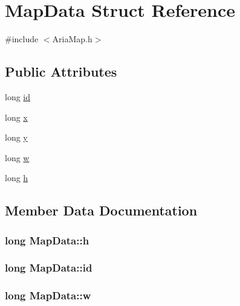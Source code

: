 \hypertarget{structMapData}{}\section{Map\+Data Struct Reference}
\label{structMapData}


{\ttfamily \#include $<$Aria\+Map.\+h$>$}

\subsection*{Public Attributes}
\begin{DoxyCompactItemize}
\item 
long \hyperlink{structMapData_ad27eaf83bb30b0b46e224d5cd78b34b7}{id}
\item 
long \hyperlink{structMapData_a52a37fc0f0cb1564824d68a86d0d4c97}{x}
\item 
long \hyperlink{structMapData_ace819161d4cd3db76cac2f104a9fb78d}{y}
\item 
long \hyperlink{structMapData_a7cc187013c2f397ddbb575ac065fe25e}{w}
\item 
long \hyperlink{structMapData_a31903efa4d79958802ee06a0f268b24a}{h}
\end{DoxyCompactItemize}


\subsection{Member Data Documentation}
\hypertarget{structMapData_a31903efa4d79958802ee06a0f268b24a}{}
\subsubsection[{h}]{\setlength{\rightskip}{0pt plus 5cm}long Map\+Data\+::h}\label{structMapData_a31903efa4d79958802ee06a0f268b24a}
\hypertarget{structMapData_ad27eaf83bb30b0b46e224d5cd78b34b7}{}
\subsubsection[{id}]{\setlength{\rightskip}{0pt plus 5cm}long Map\+Data\+::id}\label{structMapData_ad27eaf83bb30b0b46e224d5cd78b34b7}
\hypertarget{structMapData_a7cc187013c2f397ddbb575ac065fe25e}{}
\subsubsection[{w}]{\setlength{\rightskip}{0pt plus 5cm}long Map\+Data\+::w}\label{structMapData_a7cc187013c2f397ddbb575ac065fe25e}
\hypertarget{structMapData_a52a37fc0f0cb1564824d68a86d0d4c97}{}
